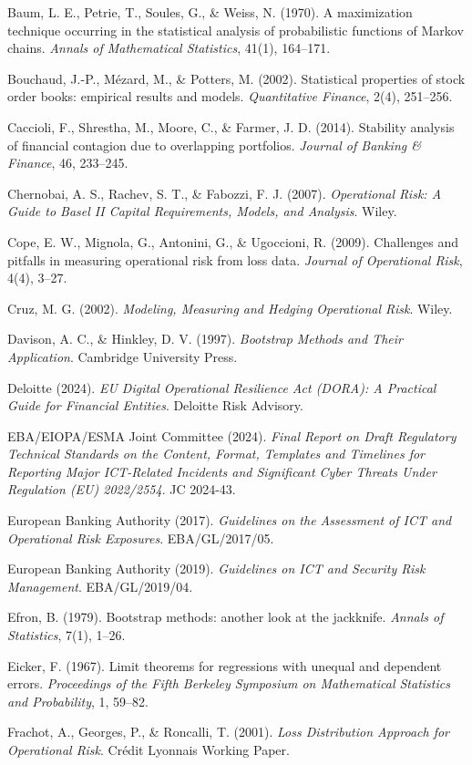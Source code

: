 \documentclass[
]{article}
\begin{document}
Baum, L. E., Petrie, T., Soules, G., \& Weiss, N. (1970). A maximization
technique occurring in the statistical analysis of probabilistic
functions of Markov chains. \emph{Annals of Mathematical Statistics},
41(1), 164--171.

Bouchaud, J.-P., Mézard, M., \& Potters, M. (2002). Statistical
properties of stock order books: empirical results and models.
\emph{Quantitative Finance}, 2(4), 251--256.

Caccioli, F., Shrestha, M., Moore, C., \& Farmer, J. D. (2014).
Stability analysis of financial contagion due to overlapping portfolios.
\emph{Journal of Banking \& Finance}, 46, 233--245.

Chernobai, A. S., Rachev, S. T., \& Fabozzi, F. J. (2007).
\emph{Operational Risk: A Guide to Basel II Capital Requirements,
Models, and Analysis}. Wiley.

Cope, E. W., Mignola, G., Antonini, G., \& Ugoccioni, R. (2009).
Challenges and pitfalls in measuring operational risk from loss data.
\emph{Journal of Operational Risk}, 4(4), 3--27.

Cruz, M. G. (2002). \emph{Modeling, Measuring and Hedging Operational
Risk}. Wiley.

Davison, A. C., \& Hinkley, D. V. (1997). \emph{Bootstrap Methods and
Their Application}. Cambridge University Press.

Deloitte (2024). \emph{EU Digital Operational Resilience Act (DORA): A
Practical Guide for Financial Entities}. Deloitte Risk Advisory.

EBA/EIOPA/ESMA Joint Committee (2024). \emph{Final Report on Draft
Regulatory Technical Standards on the Content, Format, Templates and
Timelines for Reporting Major ICT-Related Incidents and Significant
Cyber Threats Under Regulation (EU) 2022/2554}. JC 2024-43.

European Banking Authority (2017). \emph{Guidelines on the Assessment of
ICT and Operational Risk Exposures}. EBA/GL/2017/05.

European Banking Authority (2019). \emph{Guidelines on ICT and Security
Risk Management}. EBA/GL/2019/04.

Efron, B. (1979). Bootstrap methods: another look at the jackknife.
\emph{Annals of Statistics}, 7(1), 1--26.

Eicker, F. (1967). Limit theorems for regressions with unequal and
dependent errors. \emph{Proceedings of the Fifth Berkeley Symposium on
Mathematical Statistics and Probability}, 1, 59--82.

Frachot, A., Georges, P., \& Roncalli, T. (2001). \emph{Loss
Distribution Approach for Operational Risk}. Crédit Lyonnais Working
Paper.
\end{document}
